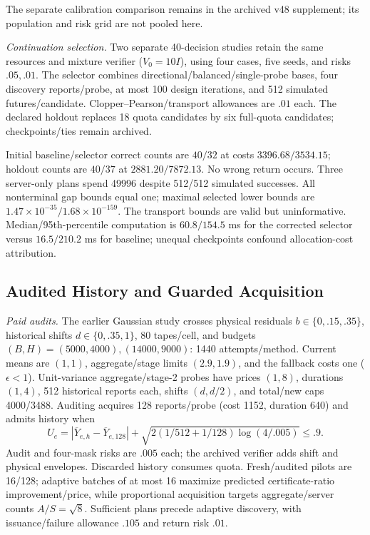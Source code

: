 The separate calibration comparison remains in the archived v48 supplement; its population and risk grid are not pooled here.

\label{app:controller-diagnostics}
\emph{Continuation selection.} Two separate 40-decision studies retain the same resources and mixture verifier ($V_0=10I$), using four cases, five seeds, and risks $.05,.01$. The selector combines directional/balanced/single-probe bases, four discovery reports/probe, at most 100 design iterations, and 512 simulated futures/candidate. Clopper--Pearson/transport allowances are $.01$ each. The declared holdout replaces 18 quota candidates by six full-quota candidates; checkpoints/ties remain archived.

Initial baseline/selector correct counts are $40/32$ at costs $3396.68/3534.15$; holdout counts are $40/37$ at $2881.20/7872.13$. No wrong return occurs. Three server-only plans spend 49996 despite 512/512 simulated successes. All nonterminal gap bounds equal one; maximal selected lower bounds are $1.47\times10^{-35}/1.68\times10^{-159}$. The transport bounds are valid but uninformative. Median/95th-percentile computation is $60.8/154.5$ ms for the corrected selector versus $16.5/210.2$ ms for baseline; unequal checkpoints confound allocation-cost attribution.

\subsection{Audited History and Guarded Acquisition}
\label{app:validity-study}
\emph{Paid audits.} The earlier Gaussian study crosses physical residuals $b\in\{0,.15,.35\}$, historical shifts $d\in\{0,.35,1\}$, 80 tapes/cell, and budgets $(B,H)=(5000,4000),(14000,9000)$: 1440 attempts/method. Current means are $(1,1)$, aggregate/stage limits $(2.9,1.9)$, and the fallback costs one ($\epsilon<1$). Unit-variance aggregate/stage-2 probes have prices $(1,8)$, durations $(1,4)$, 512 historical reports each, shifts $(d,d/2)$, and total/new caps 4000/3488. Auditing acquires 128 reports/probe (cost 1152, duration 640) and admits history when
$$U_e=|\overline Y_{e,h}-\overline Y_{e,128}|+
\sqrt{2(1/512+1/128)\log(4/.005)}\leq.9.$$
Audit and four-mask risks are $.005$ each; the archived verifier adds shift and physical envelopes. Discarded history consumes quota. Fresh/audited pilots are 16/128; adaptive batches of at most 16 maximize predicted certificate-ratio improvement/price, while proportional acquisition targets aggregate/server counts $A/S=\sqrt8$. Sufficient plans precede adaptive discovery, with issuance/failure allowance $.105$ and return risk $.01$.

